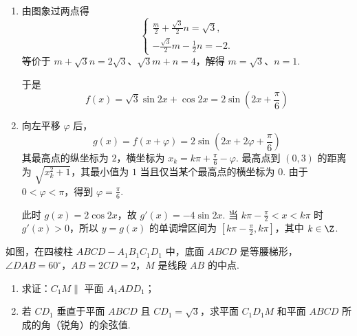 \begin{solution}
\begin{enumerate}
\item 由图象过两点得
\[
\begin{cases}
\frac m2+\frac{\sqrt3}2n=\sqrt3,\\
-\frac{\sqrt3}2m-\frac12n=-2.
\end{cases}
\]
等价于 \(m+\sqrt3n=2\sqrt3\)、\(\sqrt3m+n=4\)，解得
\(m=\sqrt3\)、\(n=1\).

于是
\[
f(x)=\sqrt3\sin2x+\cos2x=2\sin\left(2x+\frac\pi6\right)
\]
\item 向左平移 \(\varphi\) 后，
\[
g(x)=f(x+\varphi)=2\sin\left(2x+2\varphi+\frac\pi6\right)
\]
其最高点的纵坐标为 \(2\)，横坐标为
\(x_k=k\pi+\frac\pi6-\varphi\). 最高点到 \((0,3)\) 的距离为
\(\sqrt{x_k^2+1}\)，其最小值为 \(1\) 当且仅当某个最高点的横坐标为 \(0\). 由于 \(0<\varphi<\pi\)，得到 \(\varphi=\frac\pi6\).

此时 \(g(x)=2\cos2x\)，故
\(g'(x)=-4\sin2x\). 当 \(k\pi-\frac\pi2<x<k\pi\) 时 \(g'(x)>0\)，所以 \(y=g(x)\) 的单调增区间为
\(\left[k\pi-\frac\pi2,k\pi\right]\)，其中 \(k\in\Z\).
\end{enumerate}
\end{solution}

\begin{problem}
如图，在四棱柱 \(ABCD - A_{1}B_{1}C_{1}D_{1}\) 中，底面 \(ABCD\) 是等腰梯形，\(\angle DAB = 60^{\circ}\)，\(AB = 2CD = 2\)，\(M\) 是线段 \(AB\) 的中点.

\begin{enumerate}
\item 求证：\( C_{1}M \parallel\) 平面 \(A_{1}ADD_{1}\)；
\item 若 \(CD_{1}\) 垂直于平面 \(ABCD\) 且 \( CD_{1} = \sqrt{3} \)，求平面 \(C_{1}D_{1}M\) 和平面 \(ABCD\) 所成的角（锐角）的余弦值.
\end{enumerate}

\end{problem}

